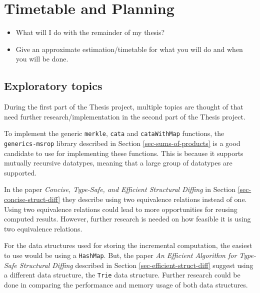 \section{Timetable and Planning}
\begin{itemize}
    \item What will I do with the remainder of my thesis?
    \item Give an approximate estimation/timetable for what you will do and when you will be done.    
\end{itemize}

\subsection{Exploratory topics}
During the first part of the Thesis project, multiple topics are thought of that need further research/implementation in the second part of the Thesis project.

To implement the generic \texttt{merkle}, \texttt{cata} and \texttt{cataWithMap} functions, the \texttt{generics-msrop} library described in Section \ref{sec-sums-of-products} is a good candidate to use for implementing these functions. This is because it supports mutually recursive datatypes, meaning that a large group of datatypes are supported. 


In the paper \textit{Concise, Type-Safe, and Efficient Structural Diffing} in Section \ref{sec-concise-struct-diff} they describe using two equivalence relations instead of one. Using two equivalence relations could lead to more opportunities for reusing computed results. However, further research is needed on how feasible it is using two equivalence relations. 

For the data structures used for storing the incremental computation, the easiest to use would be using a \texttt{HashMap}. But, the paper \textit{An Efficient Algorithm for Type-Safe Structural Diffing} described in Section \ref{sec-efficient-struct-diff} suggest using a different data structure, the \texttt{Trie} data structure. Further research could be done in comparing the performance and memory usage of both data structures.

\newpage
